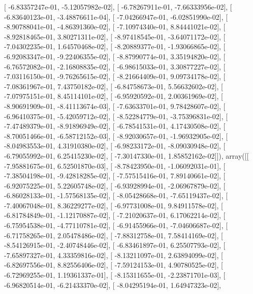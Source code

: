 \documentclass{article}
\begin{document}
       [ -6.83357247e-01,  -5.12057982e-02],
       [ -6.78267911e-01,  -7.66333956e-02],
       [ -6.83640123e-01,  -3.48876611e-04],
       [ -7.04266947e-01,  -6.02851990e-02],
       [ -8.90788041e-01,  -4.86391360e-02],
       [ -7.10974340e-01,   8.84441021e-02],
       [ -8.92818465e-01,   3.80271311e-02],
       [ -8.97418545e-01,  -3.64071172e-02],
       [ -7.04302235e-01,   1.64570468e-02],
       [ -8.20889377e-01,  -1.93066865e-02],
       [ -6.92083347e-01,  -9.22406355e-02],
       [ -8.87990774e-01,   3.35194820e-02],
       [ -6.76572082e-01,  -2.16808835e-02],
       [ -6.98615033e-01,   3.30877227e-02],
       [ -7.03116150e-01,  -9.76265615e-02],
       [ -8.21664409e-01,   9.09734178e-02],
       [ -7.08361967e-01,   7.43750182e-02],
       [ -6.84758673e-01,   5.56632602e-02],
       [ -7.07975151e-01,   8.45114101e-02],
       [ -6.95920592e-01,   2.00361969e-02],
       [ -8.90691909e-01,  -8.41113674e-03],
       [ -7.63633701e-01,   9.78428607e-02],
       [ -6.96410375e-01,  -5.42059712e-02],
       [ -8.52284779e-01,  -3.75396831e-02],
       [ -7.47489379e-01,  -8.91896949e-02],
       [ -6.78541531e-01,   4.17430508e-02],
       [ -8.70051466e-01,  -6.58712152e-03],
       [ -8.92030657e-01,  -1.96932905e-02],
       [ -8.04983553e-01,   4.31910380e-02],
       [ -6.98233172e-01,  -8.09030948e-02],
       [ -6.79055992e-01,   6.25415230e-02],
       [ -7.30147330e-01,   1.85852162e-02]]), array([[ -7.95881675e-01,   6.52501870e-03],
       [ -8.78423950e-01,  -1.06092031e-01],
       [ -7.38504198e-01,  -9.42818285e-02],
       [ -7.57515416e-01,   7.89140661e-02],
       [ -6.92075225e-01,   5.22605748e-02],
       [ -6.93928994e-01,  -2.06967879e-02],
       [ -6.86028133e-01,  -1.57568135e-02],
       [ -8.05428668e-01,  -7.65119437e-02],
       [ -7.40067048e-01,   8.36229277e-02],
       [ -6.97731008e-01,   9.84911578e-02],
       [ -6.81784849e-01,  -1.12170887e-02],
       [ -7.21020637e-01,   6.17062214e-02],
       [ -6.75954538e-01,  -4.77110781e-02],
       [ -6.91455966e-01,  -7.04606687e-02],
       [ -6.71758265e-01,   2.05478486e-02],
       [ -7.88312758e-01,   7.58414169e-02],
       [ -8.54126915e-01,  -2.40748446e-02],
       [ -6.83461897e-01,   6.25507793e-02],
       [ -7.65897327e-01,   4.33359816e-02],
       [ -8.13211097e-01,   2.63894099e-02],
       [ -6.82697556e-01,   8.82556406e-02],
       [ -7.59124153e-01,   4.90780525e-02],
       [ -6.72969255e-01,   1.19361337e-01],
       [ -8.15311655e-01,  -2.23871701e-03],
       [ -6.96820514e-01,  -6.21433370e-02],
       [ -8.04295194e-01,   1.64947323e-02],
\end{document}
